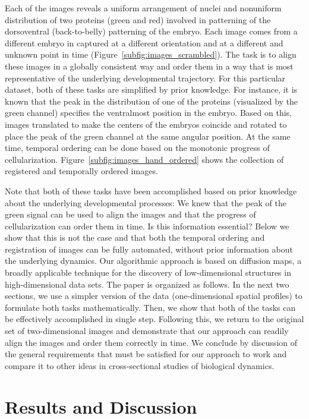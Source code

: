 \documentclass{pnastwo}
\begin{document}
\begin{article}
Each of the images reveals a uniform arrangement of nuclei and nonuniform distribution of two proteins (green and red) involved in patterning of the dorsoventral (back-to-belly) patterning of the embryo. 
%
Each image comes from a different embryo in captured at a different orientation and at a different and unknown point in time (Figure~\ref{subfig:images_scrambled}). 
%
The task is to align these images in a globally consistent way and order them in a way that is most representative of the underlying developmental trajectory. 
%
For this particular dataset, both of these tasks are simplified by prior knowledge. 
%
For instance, it is known that the peak in the distribution of one of the proteins (visualized by the green channel) specifies the ventralmost position in the embryo. 
%
Based on this, images translated to make the centers of the embryos coincide and rotated to place the peak of the green channel at the same angular position. 
%
At the same time, temporal ordering can be done based on the monotonic progress of cellularization. 
%
Figure~\ref{subfig:images_hand_ordered} shows the collection of registered and temporally ordered images. 

Note that both of these tasks have been accomplished based on prior knowledge about the underlying developmental processes: We knew that the peak of the green signal can be used to align the images and that the progress of cellularization can order them in time. 
%
Is this information essential? 
%
Below we show that this is not the case and that both the temporal ordering and registration of images can be fully automated, without prior information about the underlying dynamics. 
%
Our algorithmic approach is based on diffusion maps, a broadly applicable technique for the discovery of low-dimensional structures in high-dimensional data sets. 
%
The paper is organized as follows. 
%
In the next two sections, we use a simpler version of the data (one-dimensional spatial profiles) to formulate both tasks mathematically.  
%
Then, we show that both of the tasks can be effectively accomplished in single step. 
%
Following this, we return to the original set of two-dimensional images and demonstrate that our approach can readily align the images and order them correctly in time. 
%
We conclude by discussion of the general requirements that must be satisfied for our approach to work and compare it to other ideas in cross-sectional studies of biological dynamics. 


\section{Results and Discussion}


\end{article}
\end{document}
